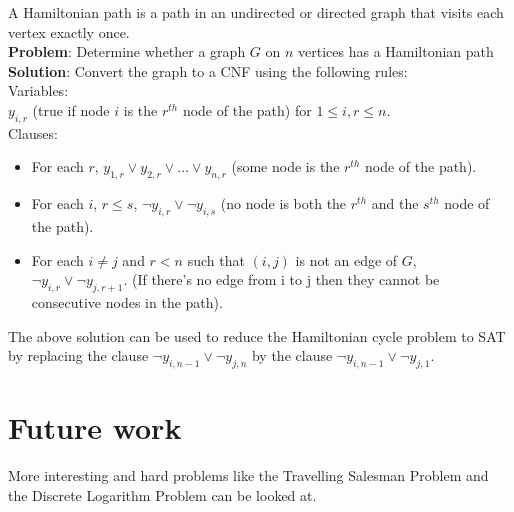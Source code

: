 A Hamiltonian path is a path in an undirected or directed graph that visits each vertex exactly once.\\
\noindent \textbf{Problem}: Determine whether a graph $G$ on $n$ vertices has a Hamiltonian path\\
\noindent \textbf{Solution}:
\noindent Convert the graph to a CNF using the following rules:\\
\noindent Variables: \\$y_{i,r}$ (true if node $i$ is the $r^{th}$ node of the path) for $1 \leq i,r \leq n$.\\
\noindent Clauses:
\begin{itemize}
\item For each $r$, $y_{1,r} \vee y_{2,r} \vee \ldots \vee y_{n,r}$ (some node is the $r^{th}$ node of the path).

\item For each $i$, $r\leq s$, $\neg y_{i,r} \vee \neg y_{i,s}$ (no node is both the $r^{th}$ and the $s^{th}$ node of the path).

\item For each $i \neq j$ and $r<n$ such that $(i,j)$ is not an edge of $G$, $\neg y_{i,r} \vee \neg y_{j,r+1}$. (If there's no edge from i to j then they cannot be consecutive nodes in the path).

\end{itemize}

\noindent The above solution can be used to reduce the Hamiltonian cycle problem to SAT by replacing the clause $\neg y_{i,n-1} \vee \neg y_{j,n}$ by the clause $\neg y_{i,n-1} \vee \neg y_{j,1}$.

\section{Future work}

More interesting and hard problems like the Travelling Salesman Problem and the Discrete Logarithm Problem can be looked at.